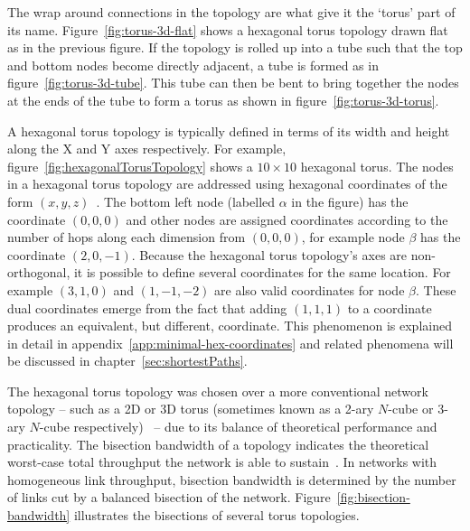 		The wrap around connections in the topology are what give it the `torus'
		part of its name. Figure~\ref{fig:torus-3d-flat} shows a hexagonal torus
		topology drawn flat as in the previous figure. If the topology is rolled up
		into a tube such that the top and bottom nodes become directly adjacent, a
		tube is formed as in figure~\ref{fig:torus-3d-tube}. This tube can then be
		bent to bring together the nodes at the ends of the tube to form a torus as
		shown in figure~\ref{fig:torus-3d-torus}.
		
		A hexagonal torus topology is typically defined in terms of its width and
		height along the X and Y axes respectively. For example,
		figure~\ref{fig:hexagonalTorusTopology} shows a $10\times10$ hexagonal
		torus.  The nodes in a hexagonal torus topology are addressed using
		hexagonal coordinates of the form $(x, y, z)$~\cite{patel15}. The bottom
		left node (labelled $\alpha$ in the figure) has the coordinate $(0, 0, 0)$
		and other nodes are assigned coordinates according to the number of hops
		along each dimension from $(0, 0, 0)$, for example node $\beta$ has the
		coordinate $(2, 0, -1)$. Because the hexagonal torus topology's axes are
		non-orthogonal, it is possible to define several coordinates for the same
		location. For example $(3, 1, 0)$ and $(1, -1, -2)$ are also valid
		coordinates for node $\beta$. These dual coordinates emerge from the fact
		that adding $(1, 1, 1)$ to a coordinate produces an equivalent, but
		different, coordinate. This phenomenon is explained in detail in
		appendix~\ref{app:minimal-hex-coordinates} and related phenomena will be
		discussed in chapter~\ref{sec:shortestPaths}.
		
		The hexagonal torus topology was chosen over a more conventional network
		topology -- such as a 2D or 3D torus (sometimes known as a 2-ary $N$-cube
		or 3-ary $N$-cube respectively)~\cite[chapters~3~and~5]{dally04} -- due to
		its balance of theoretical performance and practicality. The bisection
		bandwidth of a topology indicates the theoretical worst-case total
		throughput the network is able to sustain~\cite[chapter~1]{dally04}.  In
		networks with homogeneous link throughput, bisection bandwidth is
		determined by the number of links cut by a balanced bisection of the
		network.  Figure~\ref{fig:bisection-bandwidth} illustrates the bisections
		of several torus topologies.
		
